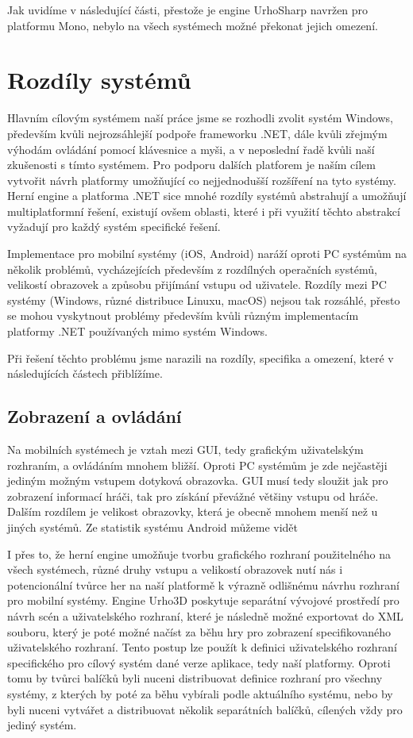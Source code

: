 Jak uvidíme v následující části, přestože je engine UrhoSharp navržen pro platformu Mono, nebylo na všech systémech možné překonat jejich omezení.

\section{Rozdíly systémů}
Hlavním cílovým systémem naší práce jsme se rozhodli zvolit systém Windows, především kvůli nejrozsáhlejší podpoře frameworku .NET, dále kvůli zřejmým výhodám ovládání pomocí klávesnice a myši, a v neposlední řadě kvůli naší zkušenosti s tímto systémem. Pro podporu dalších platforem je naším cílem vytvořit návrh platformy umožňující co nejjednodušší rozšíření na tyto systémy. Herní engine a platforma .NET sice mnohé rozdíly systémů abstrahují a umožňují multiplatformní řešení, existují ovšem oblasti, které i při využití těchto abstrakcí vyžadují pro každý systém specifické řešení.  

Implementace pro mobilní systémy (iOS, Android) naráží oproti PC systémům na několik problémů, vycházejících především z rozdílných operačních systémů, velikostí obrazovek a způsobu přijímání vstupu od uživatele. Rozdíly mezi PC systémy (Windows, různé distribuce Linuxu, macOS) nejsou tak rozsáhlé, přesto se mohou vyskytnout problémy především kvůli různým implementacím platformy .NET používaných mimo systém Windows.

Při řešení těchto problému jsme narazili na rozdíly, specifika a omezení, které v následujících částech přiblížíme.

\subsection{Zobrazení a ovládání}
Na mobilních systémech je vztah mezi GUI, tedy grafickým uživatelským rozhraním, a ovládáním mnohem bližší. Oproti PC systémům je zde nejčastěji jediným možným vstupem dotyková obrazovka. GUI musí tedy sloužit jak pro zobrazení informací hráči, tak pro získání převážné většiny vstupu od hráče. Dalším rozdílem je velikost obrazovky, která je obecně mnohem menší než u jiných systémů. Ze statistik systému Android můžeme vidět 

 

I přes to, že herní engine umožňuje tvorbu grafického rozhraní použitelného na všech systémech, různé druhy vstupu a velikostí obrazovek nutí nás i potencionální tvůrce her na naší platformě k výrazně odlišnému návrhu rozhraní pro mobilní systémy. Engine Urho3D poskytuje separátní vývojové prostředí pro návrh scén a uživatelského rozhraní, které je následně možné exportovat do XML souboru, který je poté možné načíst za běhu hry pro zobrazení specifikovaného uživatelského rozhraní. Tento postup lze použít k definici uživatelského rozhraní specifického pro cílový systém dané verze aplikace, tedy naší platformy. Oproti tomu by tvůrci balíčků byli nuceni distribuovat definice rozhraní pro všechny systémy, z kterých by poté za běhu vybírali podle aktuálního systému, nebo by byli nuceni vytvářet a distribuovat několik separátních balíčků, cílených vždy pro jediný systém. 

